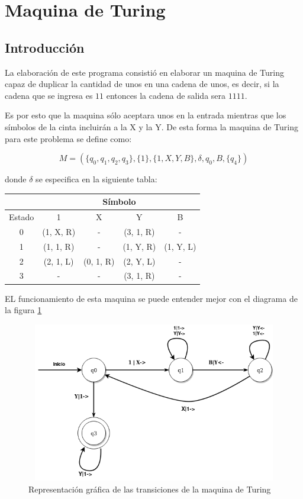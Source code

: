  
\section{Maquina de Turing}
\subsection{Introducción}
La elaboración de este programa consistió en elaborar un maquina de Turing capaz de duplicar la cantidad de unos en una cadena de unos, es decir, si la cadena que se ingresa es $ 11 $ entonces la cadena de salida sera $ 1111 $.

Es por esto que la maquina sólo aceptara unos en la entrada mientras que los símbolos de la cinta incluirán a la X y la Y. De esta forma la maquina de Turing para este problema se define como:

\[M=(\lbrace q_{0}, q_{1}, q_{2}, q_{3}\rbrace, \lbrace 1 \rbrace, \lbrace 1, X, Y, B \rbrace, \delta, q_{0}, B, \lbrace q_{4} \rbrace)\]

donde $ \delta $ se especifica en la siguiente tabla:
\begin{center}
\begin{tabular}{|c|c|c|c|c|}
\hline
& \multicolumn{4}{|c|}{Símbolo} \\ \hline
Estado & 1 & X & Y & B\\ \hline
0 & (1, X, R) & - & (3, 1, R) & -\\ \hline
1 & (1, 1, R) & - & (1, Y, R) & (1, Y, L)\\ \hline
2 & (2, 1, L) & (0, 1, R) & (2, Y, L) & -\\ \hline
3 & - & - & (3, 1, R) & - \\ \hline
\end{tabular}
\end{center}

EL funcionamiento de esta maquina se puede entender mejor con el diagrama de la figura \ref{fig:diagrama}

\begin{figure}[H]
\begin{center}
 \includegraphics[width=12cm, height=7cm]{./img/Turing-unos.png}
 \caption{Representación gráfica de las transiciones de la maquina de Turing}
 \label{fig:diagrama}
\end{center}
\end{figure}

